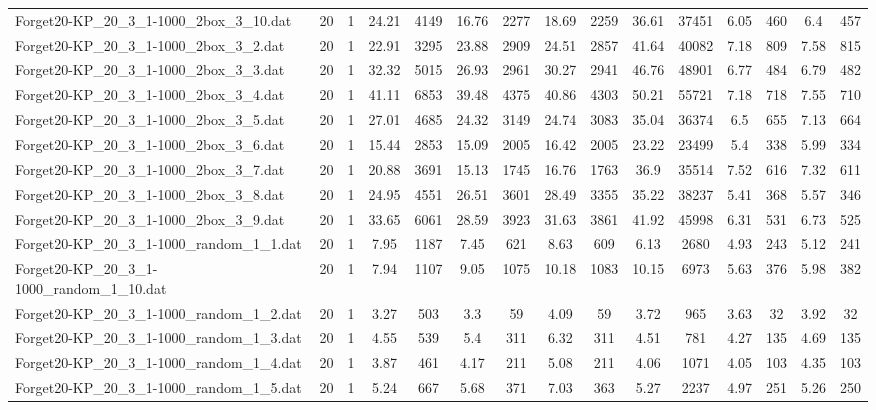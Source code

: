 \begin{table}[!ht]
{\begin{tabular}{lcccccccccccccc}
Forget20-KP\_20\_3\_1-1000\_2box\_3\_10.dat & 20 & 1 & 24.21 & 4149 & 16.76 & 2277 & 18.69 & 2259 & 36.61 & 37451 & 6.05 & 460 & 6.4 & 457 \\
Forget20-KP\_20\_3\_1-1000\_2box\_3\_2.dat & 20 & 1 & 22.91 & 3295 & 23.88 & 2909 & 24.51 & 2857 & 41.64 & 40082 & 7.18 & 809 & 7.58 & 815 \\
Forget20-KP\_20\_3\_1-1000\_2box\_3\_3.dat & 20 & 1 & 32.32 & 5015 & 26.93 & 2961 & 30.27 & 2941 & 46.76 & 48901 & 6.77 & 484 & 6.79 & 482 \\
Forget20-KP\_20\_3\_1-1000\_2box\_3\_4.dat & 20 & 1 & 41.11 & 6853 & 39.48 & 4375 & 40.86 & 4303 & 50.21 & 55721 & 7.18 & 718 & 7.55 & 710 \\
Forget20-KP\_20\_3\_1-1000\_2box\_3\_5.dat & 20 & 1 & 27.01 & 4685 & 24.32 & 3149 & 24.74 & 3083 & 35.04 & 36374 & 6.5 & 655 & 7.13 & 664 \\
Forget20-KP\_20\_3\_1-1000\_2box\_3\_6.dat & 20 & 1 & 15.44 & 2853 & 15.09 & 2005 & 16.42 & 2005 & 23.22 & 23499 & 5.4 & 338 & 5.99 & 334 \\
Forget20-KP\_20\_3\_1-1000\_2box\_3\_7.dat & 20 & 1 & 20.88 & 3691 & 15.13 & 1745 & 16.76 & 1763 & 36.9 & 35514 & 7.52 & 616 & 7.32 & 611 \\
Forget20-KP\_20\_3\_1-1000\_2box\_3\_8.dat & 20 & 1 & 24.95 & 4551 & 26.51 & 3601 & 28.49 & 3355 & 35.22 & 38237 & 5.41 & 368 & 5.57 & 346 \\
Forget20-KP\_20\_3\_1-1000\_2box\_3\_9.dat & 20 & 1 & 33.65 & 6061 & 28.59 & 3923 & 31.63 & 3861 & 41.92 & 45998 & 6.31 & 531 & 6.73 & 525 \\
Forget20-KP\_20\_3\_1-1000\_random\_1\_1.dat & 20 & 1 & 7.95 & 1187 & 7.45 & 621 & 8.63 & 609 & 6.13 & 2680 & 4.93 & 243 & 5.12 & 241 \\
Forget20-KP\_20\_3\_1-1000\_random\_1\_10.dat & 20 & 1 & 7.94 & 1107 & 9.05 & 1075 & 10.18 & 1083 & 10.15 & 6973 & 5.63 & 376 & 5.98 & 382 \\
Forget20-KP\_20\_3\_1-1000\_random\_1\_2.dat & 20 & 1 & 3.27 & 503 & 3.3 & 59 & 4.09 & 59 & 3.72 & 965 & 3.63 & 32 & 3.92 & 32 \\
Forget20-KP\_20\_3\_1-1000\_random\_1\_3.dat & 20 & 1 & 4.55 & 539 & 5.4 & 311 & 6.32 & 311 & 4.51 & 781 & 4.27 & 135 & 4.69 & 135 \\
Forget20-KP\_20\_3\_1-1000\_random\_1\_4.dat & 20 & 1 & 3.87 & 461 & 4.17 & 211 & 5.08 & 211 & 4.06 & 1071 & 4.05 & 103 & 4.35 & 103 \\
Forget20-KP\_20\_3\_1-1000\_random\_1\_5.dat & 20 & 1 & 5.24 & 667 & 5.68 & 371 & 7.03 & 363 & 5.27 & 2237 & 4.97 & 251 & 5.26 & 250 \\

\end{tabular}}
\end{table}
